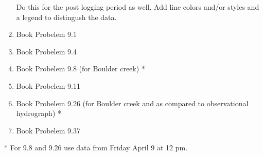 \documentclass[11pt]{article}
\begin{document}
\begin{enumerate}
Do this for the post logging period as well. Add line colors and/or styles and a legend to distingush the data. 

\item Book Probelem 9.1
\item Book Probelem 9.4
\item Book Probelem 9.8 (for Boulder creek) *
\item Book Probelem 9.11
\item Book Probelem 9.26 (for Boulder creek and as compared to observational hydrograph) *
\item Book Probelem 9.37

\end{enumerate}
* For 9.8 and 9.26 use data from Friday April 9 at 12 pm. 
\end{document}
